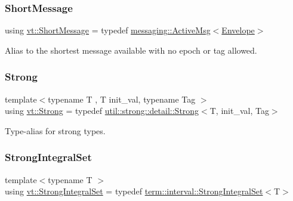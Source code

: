 \mbox{\label{namespacevt_a1125ac1da6c0bbf141e0ea0739d7602d}} 
\subsubsection{\texorpdfstring{Short\+Message}{ShortMessage}}
{\footnotesize\ttfamily using \hyperlink{namespacevt_a1125ac1da6c0bbf141e0ea0739d7602d}{vt\+::\+Short\+Message} = typedef \hyperlink{structvt_1_1messaging_1_1_active_msg}{messaging\+::\+Active\+Msg}$<$\hyperlink{namespacevt_aa9c8cc094b5361482021d63012987814}{Envelope}$>$}



Alias to the shortest message available with no epoch or tag allowed. 

\mbox{\label{namespacevt_adbd3338278905742eb2de6db590fd2f1}} 
\subsubsection{\texorpdfstring{Strong}{Strong}}
{\footnotesize\ttfamily template$<$typename T , T init\+\_\+val, typename Tag $>$ \\
using \hyperlink{namespacevt_adbd3338278905742eb2de6db590fd2f1}{vt\+::\+Strong} = typedef \hyperlink{structvt_1_1util_1_1strong_1_1detail_1_1_strong}{util\+::strong\+::detail\+::\+Strong}$<$T, init\+\_\+val, Tag$>$}



Type-\/alias for strong types. 

\mbox{\label{namespacevt_aaefb2bd6d08c8dc0ff26ed43636611b1}} 
\subsubsection{\texorpdfstring{Strong\+Integral\+Set}{StrongIntegralSet}}
{\footnotesize\ttfamily template$<$typename T $>$ \\
using \hyperlink{namespacevt_aaefb2bd6d08c8dc0ff26ed43636611b1}{vt\+::\+Strong\+Integral\+Set} = typedef \hyperlink{structvt_1_1term_1_1interval_1_1_strong_integral_set}{term\+::interval\+::\+Strong\+Integral\+Set}$<$T$>$}

